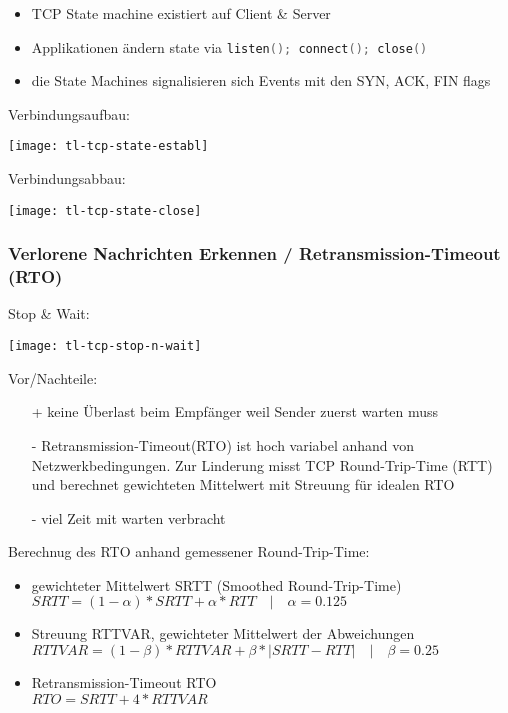 \begin{itemize}
	\item TCP State machine existiert auf Client \& Server
	\item Applikationen ändern state via
	      \lstinline[language=C]{listen(); connect(); close()}
	\item die State Machines signalisieren sich Events mit den SYN, ACK, FIN flags
\end{itemize}


Verbindungsaufbau:
\begin{center}
	\texttt{[image: tl-tcp-state-establ]}
\end{center}

Verbindungsabbau:
\begin{center}
	\texttt{[image: tl-tcp-state-close]}
\end{center}

\subsubsection{Verlorene Nachrichten Erkennen / Retransmission-Timeout (RTO)}

Stop \& Wait:
\begin{center}
	\texttt{[image: tl-tcp-stop-n-wait]}
\end{center}

Vor/Nachteile:
\begin{itemize}
	\item[+] keine Überlast beim Empfänger weil Sender zuerst warten muss
	\item[-] Retransmission-Timeout(RTO) ist hoch variabel anhand von Netzwerkbedingungen.
		Zur Linderung misst TCP Round-Trip-Time (RTT) und berechnet gewichteten Mittelwert
		mit Streuung für idealen RTO
	\item[-] viel Zeit mit warten verbracht
\end{itemize}

Berechnug des RTO anhand gemessener Round-Trip-Time:
\begin{itemize}
	\item gewichteter Mittelwert SRTT (Smoothed Round-Trip-Time)\\
	      $\mathit{SRTT} = (1 - \alpha) * \mathit{SRTT} + \alpha * \mathit{RTT}
		      \quad | \quad \alpha = 0.125$
	\item Streuung RTTVAR, gewichteter Mittelwert der Abweichungen\\
	      $\mathit{RTTVAR} = (1 - \beta) * RTTVAR + \beta * |\mathit{SRTT} - \mathit{RTT}|
		      \quad | \quad \beta = 0.25$
	\item Retransmission-Timeout RTO\\
	      $\mathit{RTO} = \mathit{SRTT} + 4 * \mathit{RTTVAR}$
\end{itemize}



